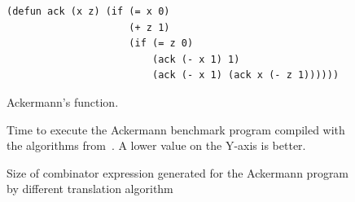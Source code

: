 \documentclass[conference]{IEEEtran}
\DeclareMathOperator{\strict}{strict}
\DeclareMathOperator{\lazy}{lazy}
\DeclareMathOperator{\lazyeta}{lazy_\eta}
\DeclareMathOperator{\linear}{linear}
\begin{document}
\begin{figure}
    \begin{lstlisting}
(defun ack (x z) (if (= x 0)
                     (+ z 1)
                     (if (= z 0)
                         (ack (- x 1) 1)
                         (ack (- x 1) (ack x (- z 1))))))
    \end{lstlisting}
    \centering
    \caption{
        Ackermann's function.
    }
    \label{fig:ack}
\end{figure}


\begin{figure}
    
    \centering
    \caption{Time to execute the Ackermann benchmark program compiled with the algorithms from~\cite{kiselyov_lambda_2018}. A lower value on the Y-axis is better.}
    \label{fig:ack-bracket-vs-kiselyov}
\end{figure}

\begin{figure}
    \centering
    \caption{Size of combinator expression generated for the Ackermann program by different translation algorithm}
    \label{fig:ack-sizes}
\end{figure}
\end{document}

